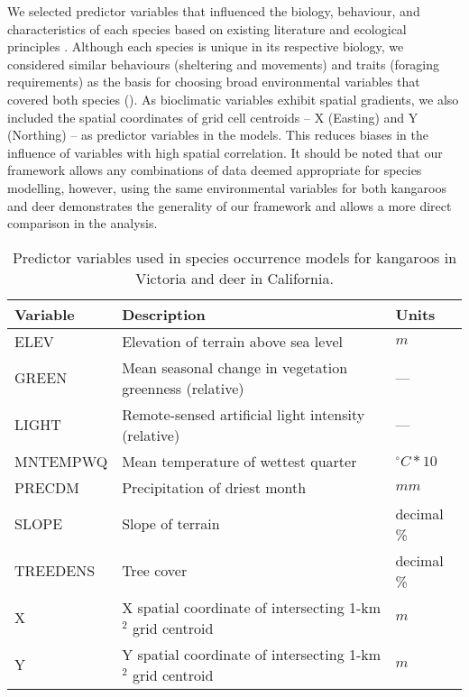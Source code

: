We selected predictor variables that influenced the biology, behaviour, and characteristics of each species based on existing literature and ecological principles \citep[e.g.][]{coul10,ferg05}. Although each species is unique in its respective biology, we considered similar behaviours (sheltering and movements) and traits (foraging requirements) as the basis for choosing broad environmental variables that covered both species ().  As bioclimatic variables exhibit spatial gradients, we also included the spatial coordinates of grid cell centroids -- X (Easting) and Y (Northing) -- as predictor variables in the models.  This reduces biases in the influence of variables with high spatial correlation.  It should be noted that our framework allows any combinations of data deemed appropriate for species modelling, however, using the same environmental variables for both kangaroos and deer demonstrates the generality of our framework and allows a more direct comparison in the analysis.

\begin{table}[!h]
\caption[Predictor variables used in species occurrence models for kangaroos and deer]{Predictor variables used in species occurrence models for kangaroos in Victoria and deer in California.}
\centering
\begin{tabularx}{0.9\textwidth}{lll} \toprule
Variable 	&Description 												&Units \\ \midrule 
ELEV 		&Elevation of terrain above sea level 						&$m$\\
GREEN 		&Mean seasonal change in vegetation greenness (relative) 	&---\\
LIGHT 		&Remote-sensed artificial light intensity (relative) 		&---\\ 
MNTEMPWQ 	&Mean temperature of wettest quarter 						&$^{\circ}C*10$\\
PRECDM 		&Precipitation of driest month 								&$mm$\\
SLOPE 		&Slope of terrain 											&decimal \%\\ 
TREEDENS 	&Tree cover 												&decimal \%\\ 
X 			&X spatial coordinate of intersecting 1-km$^2$ grid centroid &$m$\\
Y 			&Y spatial coordinate of intersecting 1-km$^2$ grid centroid &$m$\\
\bottomrule
\end{tabularx}
\label{cal_vic_vars}
\end{table}

